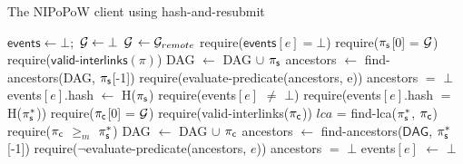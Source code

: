 \begin{algorithm}

    \caption{\label{alg:har-nipopow}The \textsf{NIPoPoW} client using hash-and-resubmit}
    \begin{algorithmic}[1]

    \State $\textsf{events} \gets \bot;$ $\mathcal{G} \gets \bot$
        \State $\mathcal{G}$ $\gets \mathcal{G}_{remote}$
    \EndFunction
        \State \textsf{require}($\textsf{events$[e]$} = \bot$)
        \State \textsf{require}($\mathsf{\pi_{s}}$[0] = $\mathcal{G}$)
        \State \textsf{require}($\textsf{valid-interlinks}(\pi)$)
        \State \textsf{DAG} $\gets$ \textsf{DAG} $\cup$ $\mathsf{\pi_{s}}$
        \State \textsf{ancestors} $\gets$ \textsf{find-ancestors(DAG, $\mathsf{\pi_{s}}$[-1])}
        \State \textsf{require}(\textsf{evaluate-predicate}(\textsf{ancestors},
        e))
        \State \textsf{ancestors} $=$ $\bot$
        \State \textsf{events$[e]$.hash} $\gets$ \textsf{H}($\mathsf{\pi_{s}}$)
        \EndFunction
        \State \textsf{require}(\textsf{events}$[e]$ $\ne$ $\bot$)
        \State \textsf{require}(\textsf{events$[e]$.hash} $=$ \textsf{H}($\mathsf{\pi_{s}^*}$))
        \State \textsf{require}($\mathsf{\pi_{c}}$[0] = $\mathcal{G}$)
        \State \textsf{require}(\textsf{valid-interlinks}($\mathsf{\pi_{c}}$))
        \State $lca$ = \textsf{find-lca}($\mathsf{\pi_{s}^*}$, $\mathsf{\pi_{c}}$)
        \State \textsf{require}($\mathsf{\pi_{c}}$ $\geq_m$ $\mathsf{\pi_{s}^*}$)
        \State \textsf{DAG} $\gets$ \textsf{DAG} $\cup$ $\mathsf{\pi_{c}}$
        \State \textsf{ancestors} $\gets$
        \textsf{find-ancestors}($\textsf{DAG}$, $\mathsf{\pi_{s}^*}$[-1])
        \State \textsf{require}($\neg$\textsf{evaluate-predicate}(\textsf{ancestors}, $e$))
        \State \textsf{ancestors} $=$ $\bot$
        \State \textsf{events$[e]$} $\gets$ $\bot$
    \EndFunction
    \EndContract
    \vskip8pt
    \end{algorithmic}
\end{algorithm}

